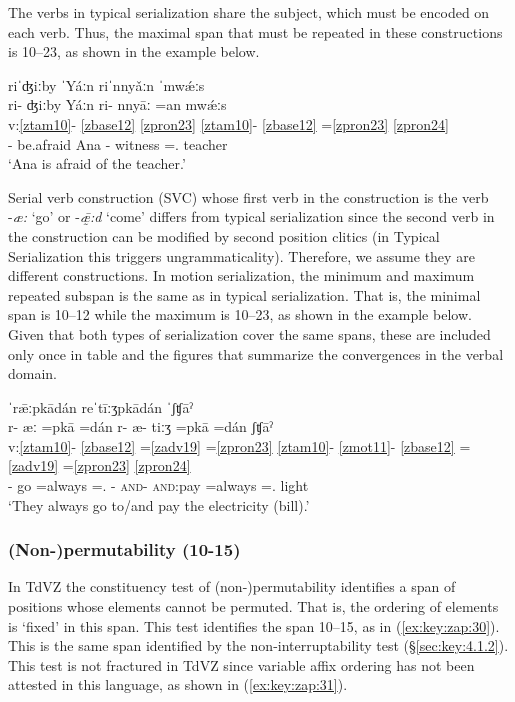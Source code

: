\documentclass[output=paper]{langscibook}
\begin{document}
The verbs in typical serialization share the subject, which must be encoded on each verb. Thus, the maximal span that must be repeated in these constructions is 10--23, as shown in the example below. 


\ea\label{ex:key:zap:28} 
{riˈʤiːby ˈYáːn riˈnnyǎːn ˈmwǽːs} \\ 
\glll ri- ʤiːby Yáːn ri- nnyāː =an mwǽːs\\
v:\ref{ztam10}- \ref{zbase12} \ref{zpron23} \ref{ztam10}{}- \ref{zbase12} =\ref{zpron23} \ref{zpron24} \\ 
\Hab{}- be.afraid Ana \Hab{}- witness =\Third\Sg{}.\Inf{} teacher\\
\glt `Ana is afraid of the teacher.'
\z

Serial verb construction (SVC) whose first verb in the construction is the verb -\textit{æ:} `go' or -\textit{ǣ̰:d} `come' differs from typical serialization since the second verb in the construction can be modified by second position clitics (in Typical Serialization this triggers ungrammaticality). Therefore, we assume they are different constructions. In motion serialization, the minimum and maximum repeated subspan is the same as in typical serialization. That is, the minimal span is 10–12 while the maximum is 10–23, as shown in the example below. Given that both types of serialization cover the same spans, these are included only once in table and the figures that summarize the convergences in the verbal domain.

\ea\label{ex:key:zap:29}
{ˈrǣːpkādán reˈtīːʒpkādán ˈʃʧāˀ}\\
\glll r- æː =pkā =dán r- æ- tiːʒ =pkā =dán ʃʧāˀ\\
v:\ref{ztam10}- \ref{zbase12} =\ref{zadv19} =\ref{zpron23} \ref{ztam10}{}- \ref{zmot11}- \ref{zbase12} =\ref{zadv19} =\ref{zpron23} \ref{zpron24} \\
\Hab{}- go =always =\Third\Pl{}.\Inf{} \Hab{}- \textsc{and}- \textsc{and}:pay =always =\Third\Pl{}.\Inf{} light \\
\glt `They always go to/and pay the electricity (bill).'
\z

\subsubsection{(Non-)permutability (10-15)}

In TdVZ the constituency test of (non-)permutability identifies a span of positions whose elements cannot be permuted. That is, the ordering of elements is `fixed' in this span. This test identifies the span 10–15, as in (\ref{ex:key:zap:30}). This is the same span identified by the non-interruptability test (\S \ref{sec:key:4.1.2}). This test is not fractured in TdVZ since variable affix ordering has not been attested in this language, as shown in (\ref{ex:key:zap:31}).
\end{document}
